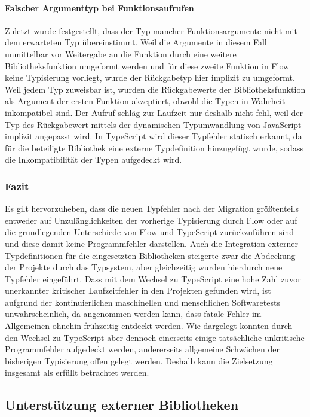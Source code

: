 \vspace{-0.5\baselineskip}
\paragraph{Falscher Argumenttyp bei Funktionsaufrufen}
Zuletzt wurde festgestellt, dass der Typ mancher Funktionsargumente nicht mit dem erwarteten Typ übereinstimmt. Weil die Argumente in diesem Fall unmittelbar vor Weitergabe an die Funktion durch eine weitere Bibliotheksfunktion umgeformt werden und für diese zweite Funktion in Flow keine Typisierung vorliegt, wurde der Rückgabetyp hier implizit zu  umgeformt. Weil  jedem Typ zuweisbar ist, wurden die Rückgabewerte der Bibliotheksfunktion als Argument der ersten Funktion akzeptiert, obwohl die Typen in Wahrheit inkompatibel sind. Der Aufruf schläg zur Laufzeit nur deshalb nicht fehl, weil der Typ des Rückgabewert mittels der dynamischen Typumwandlung von JavaScript implizit angepasst wird. In TypeScript wird dieser Typfehler statisch erkannt, da für die beteiligte Bibliothek eine externe Typdefinition hinzugefügt wurde, sodass die Inkompatibilität der Typen aufgedeckt wird.

\subsubsection{Fazit}

Es gilt hervorzuheben, dass die neuen Typfehler nach der Migration größtenteils entweder auf Unzulänglichkeiten der vorherige Typisierung durch Flow oder auf die grundlegenden Unterschiede von Flow und TypeScript zurückzuführen sind und diese damit keine Programmfehler darstellen. Auch die Integration externer Typdefinitionen für die eingesetzten Bibliotheken steigerte zwar die Abdeckung der Projekte durch das Typsystem, aber gleichzeitig wurden hierdurch neue Typfehler eingeführt. Dass mit dem Wechsel zu TypeScript eine hohe Zahl zuvor unerkannter kritischer Laufzeitfehler in den Projekten gefunden wird, ist aufgrund der kontinuierlichen maschinellen und menschlichen Softwaretests unwahrscheinlich, da angenommen werden kann, dass fatale Fehler im Allgemeinen ohnehin frühzeitig entdeckt werden. Wie dargelegt konnten durch den Wechsel zu TypeScript aber dennoch einerseits einige tatsächliche unkritische Programmfehler aufgedeckt werden, andererseits allgemeine Schwächen der bisherigen Typisierung offen gelegt werden. Deshalb kann die Zielsetzung insgesamt als erfüllt betrachtet werden.

\subsection{Unterstützung externer Bibliotheken}


